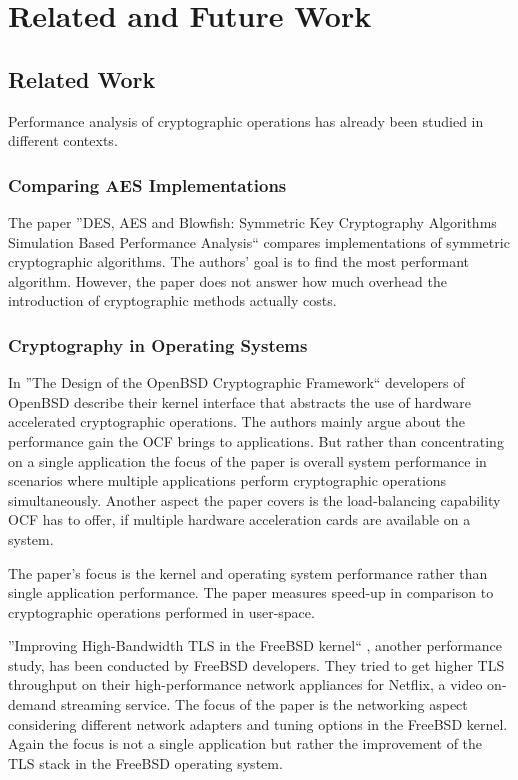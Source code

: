 \chapter{Related and Future Work}

\section{Related Work}\label{relatedwork}

Performance analysis of cryptographic operations has already been studied in different contexts.

	\subsection{Comparing AES Implementations}

The paper ''DES, AES and Blowfish: Symmetric Key Cryptography Algorithms Simulation Based Performance Analysis`` \cite{thakur2011aes} compares implementations of symmetric cryptographic algorithms.
The authors' goal is to find the most performant algorithm.
However, the paper does not answer how much overhead the introduction of cryptographic methods actually costs.\cite{thakur2011aes}

	\subsection{Cryptography in Operating Systems}

In ''The Design of the OpenBSD Cryptographic Framework`` \cite{ocf} developers of OpenBSD describe their kernel interface that abstracts the use of hardware accelerated cryptographic operations.
The authors mainly argue about the performance gain the OCF brings to applications.
But rather than concentrating on a single application the focus of the paper is overall system performance in scenarios where multiple applications perform cryptographic operations simultaneously.
Another aspect the paper covers is the load-balancing capability OCF has to offer, if multiple hardware acceleration cards are available on a system.

The paper's focus is the kernel and operating system performance rather than single application performance.
The paper measures speed-up in comparison to cryptographic operations performed in user-space.\cite{ocf}

''Improving High-Bandwidth TLS in the FreeBSD kernel`` \cite{freebsdtls}, another performance study, has been conducted by FreeBSD developers.
They tried to get higher TLS throughput on their high-performance network appliances for Netflix, a video on-demand streaming service.
The focus of the paper is the networking aspect considering different network adapters and tuning options in the FreeBSD kernel.
Again the focus is not a single application but rather the improvement of the TLS stack in the FreeBSD operating system.\cite{freebsdtls}

